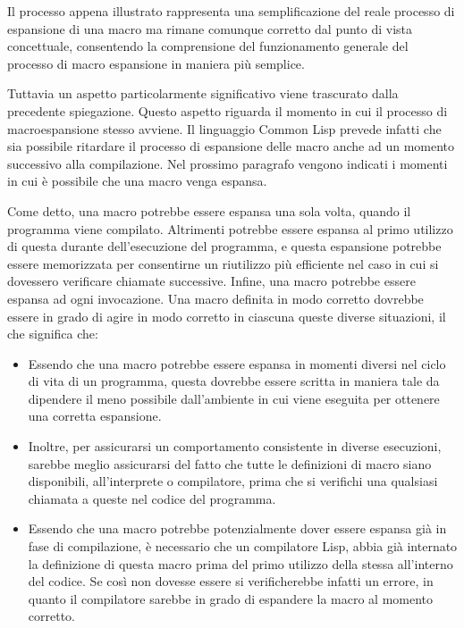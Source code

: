 Il processo appena illustrato rappresenta una semplificazione del reale processo
di espansione di una macro ma rimane comunque corretto dal punto di vista
concettuale, consentendo la comprensione del funzionamento generale del
processo di macro espansione in maniera più semplice.

Tuttavia un aspetto particolarmente significativo viene trascurato dalla
precedente spiegazione. Questo aspetto riguarda il momento in cui il processo di
macroespansione stesso avviene. Il linguaggio Common Lisp prevede infatti che
sia possibile ritardare il processo di espansione delle macro anche ad un
momento successivo alla compilazione. Nel prossimo paragrafo vengono indicati i
momenti in cui è possibile che una macro venga espansa.

Come detto, una macro potrebbe essere espansa una sola volta, quando il
programma viene compilato. Altrimenti potrebbe essere espansa al primo utilizzo
di questa durante dell’esecuzione del programma, e questa espansione potrebbe
essere memorizzata per consentirne un riutilizzo più efficiente nel caso in cui
si dovessero verificare chiamate successive. Infine, una macro potrebbe essere
espansa ad ogni invocazione. Una macro definita in modo corretto dovrebbe essere
in grado di agire in modo corretto in ciascuna queste diverse situazioni, il che
significa che:

\begin{itemize}

\item Essendo che una macro potrebbe essere espansa in momenti diversi nel ciclo
di vita di un programma, questa dovrebbe essere scritta in maniera tale da
dipendere il meno possibile dall’ambiente in cui viene eseguita per ottenere una
corretta espansione.

\item Inoltre, per assicurarsi un comportamento consistente in diverse
esecuzioni, sarebbe meglio assicurarsi del fatto che tutte le definizioni di
macro siano disponibili, all’interprete o compilatore, prima che si verifichi
una qualsiasi chiamata a queste nel codice del programma.

\item Essendo che una macro potrebbe potenzialmente dover essere espansa già in
fase di compilazione, è necessario che un compilatore Lisp, abbia già internato
la definizione di questa macro prima del primo utilizzo della stessa all’interno
del codice. Se così non dovesse essere si verificherebbe infatti un errore, in
quanto il compilatore sarebbe in grado di espandere la macro al momento
corretto.

\end{itemize}

